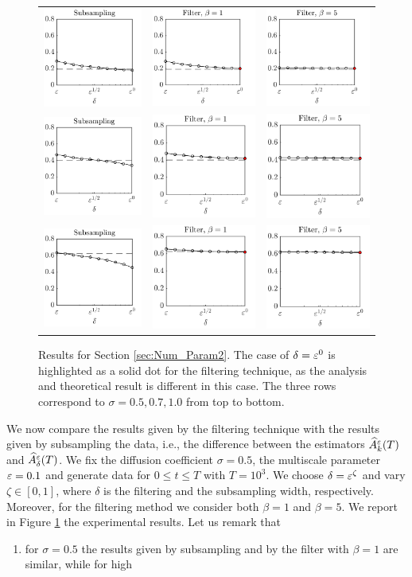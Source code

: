 \documentclass[10pt]{article}
\begin{document}
\begin{figure}[t]
	\centering
	\begin{tabular}{ccc}
		\includegraphics[]{Figures/OUSubs_s5} & \includegraphics[]{Figures/OUFilt_s5_b1}  & \includegraphics[]{Figures/OUFilt_s5_b5} \\ %
		\includegraphics[]{Figures/OUSubs_s7} & \includegraphics[]{Figures/OUFilt_s7_b1}  & \includegraphics[]{Figures/OUFilt_s7_b5} \\ %
		\includegraphics[]{Figures/OUSubs_s10} & \includegraphics[]{Figures/OUFilt_s10_b1}  & \includegraphics[]{Figures/OUFilt_s10_b5} %
	\end{tabular}
	\caption{Results for Section \ref{sec:Num_Param2}. The case of $\delta = \varepsilon^0$ is highlighted as a solid dot for the filtering technique, as the analysis and theoretical result is different in this case. The three rows correspond to $\sigma = 0.5, 0.7, 1.0$ from top to bottom.}
	\label{fig:OU}
\end{figure}

We now compare the results given by the filtering technique with the results given by subsampling the data, i.e., the difference between the estimators $\widehat A^\varepsilon_k(T)$ and $\widehat A^\varepsilon_\delta(T)$. We fix the diffusion coefficient $\sigma = 0.5$, the multiscale parameter $\varepsilon = 0.1$ and generate data for $0 \leq t \leq T$ with $T = 10^3$. We choose $\delta = \varepsilon^{\zeta}$ and vary $\zeta \in [0, 1]$, where $\delta$ is the filtering and the subsampling width, respectively. Moreover, for the filtering method we consider both $\beta = 1$ and $\beta = 5$. We report in Figure \ref{fig:OU} the experimental results. Let us remark that
\begin{enumerate}
	\item for $\sigma = 0.5$ the results given by subsampling and by the filter with $\beta = 1$ are similar, while for high
\end{enumerate}
\end{document}
